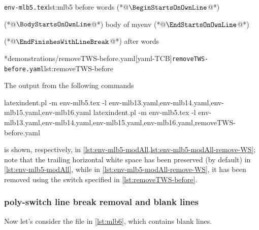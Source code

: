 	\begin{minipage}{.45\linewidth}
		\begin{cmhlistings}[style=tcblatex,showspaces=true,escapeinside={(*@}{@*)}]{\texttt{env-mlb5.tex}}{lst:mlb5}
before words   (*@$\BeginStartsOnOwnLine$@*) 
\begin{myenv}           (*@$\BodyStartsOnOwnLine$@*)
body of myenv      (*@$\EndStartsOnOwnLine$@*) 
\end{myenv}     (*@$\EndFinishesWithLineBreak$@*)
after words
\end{cmhlistings}
	\end{minipage}
	\hfill
	\begin{minipage}{.45\linewidth}
		\cmhlistingsfromfile[style=yaml-LST]*{demonstrations/removeTWS-before.yaml}[yaml-TCB]{\texttt{removeTWS-before.yaml}}{lst:removeTWS-before}
	\end{minipage}

	The output from the following commands \begin{widepage} \begin{commandshell}
latexindent.pl -m env-mlb5.tex -l env-mlb13.yaml,env-mlb14.yaml,env-mlb15.yaml,env-mlb16.yaml
latexindent.pl -m env-mlb5.tex -l env-mlb13.yaml,env-mlb14.yaml,env-mlb15.yaml,env-mlb16.yaml,removeTWS-before.yaml
\end{commandshell} \end{widepage} is shown, respectively, in \cref{lst:env-mlb5-modAll,lst:env-mlb5-modAll-remove-WS}; note that the trailing horizontal white space has been preserved (by default) in \cref{lst:env-mlb5-modAll}, while in \cref{lst:env-mlb5-modAll-remove-WS}, it has been removed using the switch specified in \cref{lst:removeTWS-before}.

	\begin{widepage}

	\end{widepage}

\subsubsection{poly-switch line break removal and blank lines}
	Now let's consider the file in \cref{lst:mlb6}, which contains blank lines.

